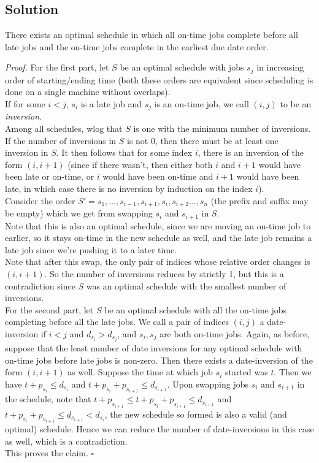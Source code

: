 \documentclass[a4paper]{article}
\newenvironment{proof}{\begin{breakbox}\textit{Proof.}}{\hfill$\square$\end{breakbox}}
\newcommand{\nl}{\vspace{0.2cm}\\}
\begin{document}
\subsection{Solution}
\begin{claim}
    There exists an optimal schedule in which all on-time jobs complete before all late jobs and the on-time jobs complete in the earliest due date order.
\end{claim}
\begin{proof}
    For the first part, let $S$ be an optimal schedule with jobs $s_j$ in increasing order of starting/ending time (both these orders are equivalent since scheduling is done on a single machine
    without overlaps).\nl
    If for some $i < j$, $s_i$ is a late job and $s_j$ is an on-time job, we call $(i, j)$ to be an \emph{inversion}.\nl
    Among all schedules, wlog that $S$ is one with the minimum number of inversions. If the number of inversions in $S$ is not $0$, then there must be at least one inversion in $S$. It then follows that for some index $i$, there is an inversion of the
    form $(i, i + 1)$ (since if there wasn't, then either both $i$ and $i + 1$ would have been late or on-time, or $i$ would have been on-time and $i + 1$ would have been late, in which case there
    is no inversion by induction on the index $i$).\nl
    Consider the order $S' = s_1, \ldots, s_{i-1}, s_{i+1}, s_i, s_{i+2}\ldots, s_n$ (the prefix and suffix may be empty) which we get from swapping $s_i$ and $s_{i+1}$ in $S$.\nl
    Note that this is also an optimal schedule, since we are moving an on-time job to earlier, so it stays on-time in the new schedule as well, and the late job remains a late job since we're pushing
    it to a later time.\nl
    Note that after this swap, the only pair of indices whose relative order changes is $(i, i + 1)$. So the number of inversions reduces by strictly 1, but this is a contradiction since $S$ was
    an optimal schedule with the smallest number of inversions.\nl
    For the second part, let $S$ be an optimal schedule with all the on-time jobs completing before all the late jobs. We call a pair of indices $(i, j)$ a date-inversion if $i < j$ and
    $d_{s_i} > d_{s_j}$, and $s_i, s_j$ are both on-time jobs. Again, as before, suppose that the least number of date inversions for any optimal schedule with on-time jobs before late jobs is non-zero. Then there exists a date-inversion of
    the form $(i, i + 1)$ as well. Suppose the time at which job $s_i$ started was $t$. Then we have $t + p_{s_i} \le d_{s_i}$ and $t + p_{s_i} + p_{s_{i+1}} \le d_{s_{i+1}}$. Upon swapping
    jobs $s_i$ and $s_{i+1}$ in the schedule, note that $t + p_{s_{i+1}} \le t + p_{s_i} + p_{s_{i+1}} \le d_{s_{i+1}}$ and $t + p_{s_i} + p_{s_{i+1}} \le d_{s_{i+1}} < d_{s_i}$, the new schedule
    so formed is also a valid (and optimal) schedule. Hence we can reduce the number of date-inversions in this case as well, which is a contradiction.\nl
    This proves the claim.
\end{proof}
\end{document}
